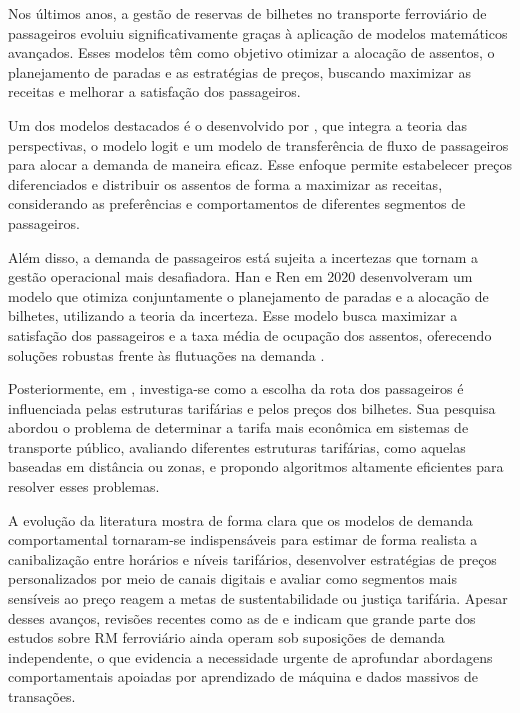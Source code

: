 Nos últimos anos, a gestão de reservas de bilhetes no transporte ferroviário de passageiros evoluiu significativamente graças à aplicação de modelos matemáticos avançados. Esses modelos têm como objetivo otimizar a alocação de assentos, o planejamento de paradas e as estratégias de preços, buscando maximizar as receitas e melhorar a satisfação dos passageiros.

Um dos modelos destacados é o desenvolvido por \citep{zhou2023pricing}, que integra a teoria das perspectivas, o modelo logit e um modelo de transferência de fluxo de passageiros para alocar a demanda de maneira eficaz. Esse enfoque permite estabelecer preços diferenciados e distribuir os assentos de forma a maximizar as receitas, considerando as preferências e comportamentos de diferentes segmentos de passageiros.

Além disso, a demanda de passageiros está sujeita a incertezas que tornam a gestão operacional mais desafiadora. Han e Ren em 2020 desenvolveram um modelo que otimiza conjuntamente o planejamento de paradas e a alocação de bilhetes, utilizando a teoria da incerteza. Esse modelo busca maximizar a satisfação dos passageiros e a taxa média de ocupação dos assentos, oferecendo soluções robustas frente às flutuações na demanda \citep{han2020uncertainty}.

Posteriormente, em \citep{schoebel2021tariff}, investiga-se como a escolha da rota dos passageiros é influenciada pelas estruturas tarifárias e pelos preços dos bilhetes. Sua pesquisa abordou o problema de determinar a tarifa mais econômica em sistemas de transporte público, avaliando diferentes estruturas tarifárias, como aquelas baseadas em distância ou zonas, e propondo algoritmos altamente eficientes para resolver esses problemas.

A evolução da literatura mostra de forma clara que os modelos de demanda comportamental tornaram-se indispensáveis para estimar de forma realista a canibalização entre horários e níveis tarifários, desenvolver estratégias de preços personalizados por meio de canais digitais e avaliar como segmentos mais sensíveis ao preço reagem a metas de sustentabilidade ou justiça tarifária. Apesar desses avanços, revisões recentes como as de \citep{Ammirato2020} e \citep{Besinovic2022} indicam que grande parte dos estudos sobre RM ferroviário ainda operam sob suposições de demanda independente, o que evidencia a necessidade urgente de aprofundar abordagens comportamentais apoiadas por aprendizado de máquina e dados massivos de transações.


